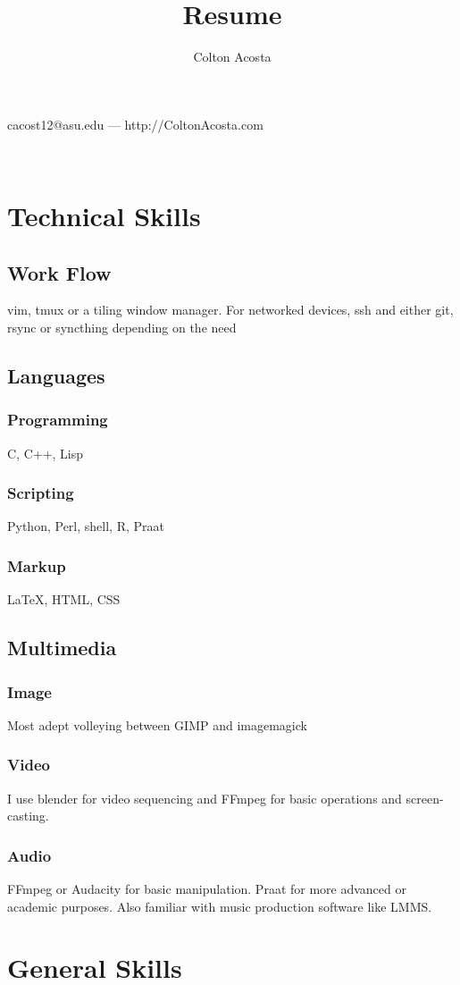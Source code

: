 \documentclass{article}
\makeatletter
\renewcommand{\maketitle}{
\begin{center}
	{\huge\bfseries	
	\theauthor}

\vspace{.25em}

cacost12@asu.edu --- http://ColtonAcosta.com
\end{center}

\
}
\makeatother
\begin{document}
\title{Resume}
\author{Colton Acosta}
\maketitle
\section{Technical Skills}
\subsection{Work Flow}
vim, tmux or a tiling window manager. For networked devices, ssh and either git, rsync or syncthing depending on the need
\subsection{Languages}
\subsubsection{Programming}
C, C++, Lisp
\subsubsection{Scripting}
Python, Perl, shell, R, Praat
\subsubsection{Markup}
{\LaTeX}, HTML, CSS
\subsection{Multimedia}
\subsubsection{Image}
Most adept volleying between GIMP and imagemagick
\subsubsection{Video}
I use blender for video sequencing and FFmpeg for basic operations and screen-casting.
\subsubsection{Audio}
FFmpeg or Audacity for basic manipulation. Praat for more advanced or academic purposes. Also familiar with music production software like LMMS.
\section{General Skills}
\end{document}
